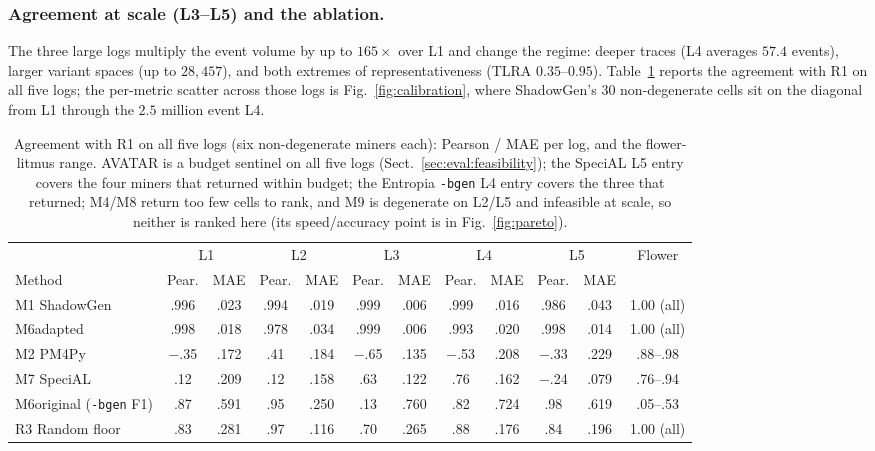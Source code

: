 \documentclass[runningheads]{llncs}
\newcommand{\chg}[1]{#1}
\begin{document}
\subsubsection{Agreement at scale (L3--L5) and the ablation.}
\label{sec:eval:scale}
The three large logs multiply the event volume by up to $165\times$ over L1 and change the regime: deeper traces (L4 averages $57.4$ events), larger variant spaces (up to $28{,}457$), and both extremes of representativeness (TLRA $0.35$--$0.95$). Table~\ref{tab:scale} reports the agreement with R1 on all five logs; the per-metric scatter across those logs is Fig.~\ref{fig:calibration}, where ShadowGen's 30 non-degenerate cells sit on the diagonal from L1 through the $2.5$ million event L4.

\begin{table}[t]
\centering
\caption{Agreement with R1 on all five logs (six non-degenerate miners each): Pearson / MAE per log, and the flower-litmus range. \chg{AVATAR is a budget sentinel on all five logs (Sect.~\ref{sec:eval:feasibility});} the SpeciAL L5 entry covers the four miners that returned within budget; \chg{the Entropia \texttt{-bgen} L4 entry covers the three that returned;} M4/M8 return too few cells to rank, and M9 is degenerate on L2/L5 and infeasible at scale, so neither is ranked here (its speed/accuracy point is in Fig.~\ref{fig:pareto}).}
\label{tab:scale}
\setlength{\tabcolsep}{2.2pt}
\scriptsize
\begin{tabular}{@{}l cc cc cc cc cc c@{}}
\toprule
 & \multicolumn{2}{c}{L1} & \multicolumn{2}{c}{L2} & \multicolumn{2}{c}{L3} & \multicolumn{2}{c}{L4} & \multicolumn{2}{c}{L5} & Flower \\
\cmidrule(lr){2-3}\cmidrule(lr){4-5}\cmidrule(lr){6-7}\cmidrule(lr){8-9}\cmidrule(lr){10-11}
Method & Pear. & MAE & Pear. & MAE & Pear. & MAE & Pear. & MAE & Pear. & MAE & \\
\midrule
M1 ShadowGen & .996 & .023 & .994 & .019 & .999 & .006 & .999 & .016 & .986 & .043 & 1.00 (all) \\
M6adapted & .998 & .018 & .978 & .034 & .999 & .006 & .993 & .020 & .998 & .014 & 1.00 (all) \\
M2 PM4Py & $-$.35 & .172 & .41 & .184 & $-$.65 & .135 & $-$.53 & .208 & $-$.33 & .229 & .88--.98 \\
M7 SpeciAL & .12 & .209 & .12 & .158 & .63 & .122 & .76 & .162 & $-$.24 & .079 & .76--.94 \\
M6original (\texttt{-bgen} F1) & .87 & .591 & .95 & .250 & .13 & .760 & .82 & .724 & .98 & .619 & .05--.53 \\
R3 Random floor & .83 & .281 & .97 & .116 & .70 & .265 & .88 & .176 & .84 & .196 & 1.00 (all) \\
\bottomrule
\end{tabular}
\end{table}
\end{document}
